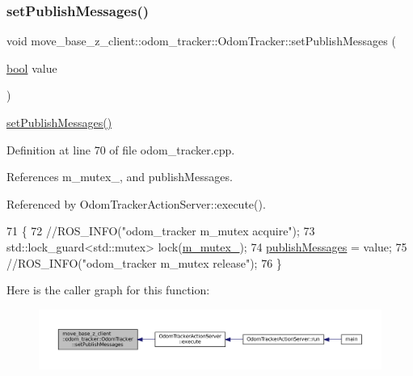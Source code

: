 \subsubsection{\texorpdfstring{set\+Publish\+Messages()}{setPublishMessages()}}
{\footnotesize\ttfamily void move\+\_\+base\+\_\+z\+\_\+client\+::odom\+\_\+tracker\+::\+Odom\+Tracker\+::set\+Publish\+Messages (\begin{DoxyParamCaption}\item[{\hyperlink{classbool}{bool}}]{value }\end{DoxyParamCaption})}

\hyperlink{classmove__base__z__client_1_1odom__tracker_1_1OdomTracker_af567cbb995d224a9737ec9080c7d0f09}{set\+Publish\+Messages()} 

Definition at line 70 of file odom\+\_\+tracker.\+cpp.



References m\+\_\+mutex\+\_\+, and publish\+Messages.



Referenced by Odom\+Tracker\+Action\+Server\+::execute().


\begin{DoxyCode}
71 \{
72     \textcolor{comment}{//ROS\_INFO("odom\_tracker m\_mutex acquire");}
73     std::lock\_guard<std::mutex> lock(\hyperlink{classmove__base__z__client_1_1odom__tracker_1_1OdomTracker_a63676e03be48b18ac48d5e2f11f19a25}{m\_mutex\_});
74     \hyperlink{classmove__base__z__client_1_1odom__tracker_1_1OdomTracker_a7fa39bb2ddd9e60778687c854ea0c59c}{publishMessages} = value;
75     \textcolor{comment}{//ROS\_INFO("odom\_tracker m\_mutex release");}
76 \}
\end{DoxyCode}
Here is the caller graph for this function\+:
\nopagebreak
\begin{figure}[H]
\begin{center}
\leavevmode
\includegraphics[width=350pt]{classmove__base__z__client_1_1odom__tracker_1_1OdomTracker_af567cbb995d224a9737ec9080c7d0f09_icgraph}
\end{center}
\end{figure}
\mbox{\label{classmove__base__z__client_1_1odom__tracker_1_1OdomTracker_afa402777496c8d0df39191f40377bd0e}} 
